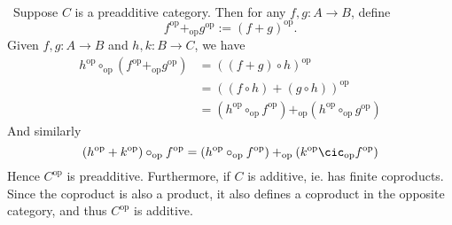 
\def\op{\text{op}}


\mmaketitle

\begin{exercise}[1]\ 

\end{exercise}


\begin{exercise}[2]\ 
Suppose $C$ is a preadditive category. Then 
for any $f,g : A \to B$, define
\[ f^\op +_\op g^\op := (f + g)^\op. \]
Given $f,g : A \to B$ and $h,k : B \to C$, we have
\begin{align*}
h^\op \circ_\op (f^\op +_\op g^\op)  
&= ((f+g)\circ h)^\op \\
&= ((f\circ h) + (g\circ h))^\op \\
&= (h^\op \circ_\op f^\op) +_\op (h^\op \circ_\op g^\op)
\end{align*}
And similarly 
\[ (h^\op + k^\op) \circ_\op f^\op = (h^\op \circ_\op f^\op) +_\op (k^\op \cic_\op
f^\op) \]
%
Hence $C^\op$ is preadditive. 
Furthermore, if $C$ is additive, ie. has finite coproducts. 
Since the coproduct is also a product, it also defines a coproduct in the
opposite category, and thus $C^\op$ is additive.
\end{exercise}





